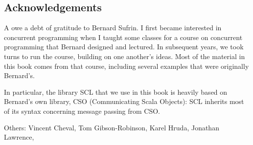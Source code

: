 



\subsection*{Acknowledgements}

A owe a debt of gratitude to Bernard Sufrin.  I first became interested in
concurrent programming when I taught some classes for a course on concurrent
programming that Bernard designed and lectured.  In subsequent years, we took
turns to run the course, building on one another's ideas.  Most of the
material in this book comes from that course, including several examples that
were originally Bernard's. 

In particular, the library SCL that we use in this book is heavily based on
Bernard's own library, CSO (Communicating Scala Objects): SCL inherits most of
its syntax concerning message passing from CSO.

Others: 
Vincent Cheval, 
Tom Gibson-Robinson, 
Karel Hruda, 
Jonathan Lawrence, 
\framebox{\ldots}
